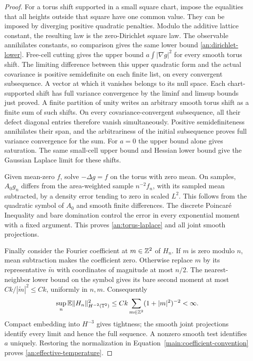 \begin{proof}
For a torus shift supported in a small square chart, impose
the equalities that all heights outside that square have one
common value.  They can be imposed by diverging positive
quadratic penalties.  Modulo the additive lattice constant,
the resulting law is the zero-Dirichlet square law.  The
observable annihilates constants, so comparison gives the
same lower bound \eqref{an:dirichlet-lower}.  Free-cell
cutting gives the upper bound $a\int|\nabla g|^2$ for every
smooth torus shift.  The limiting difference between this
upper quadratic form and the actual covariance is positive
semidefinite on each finite list, on every convergent
subsequence.  A vector at which it vanishes belongs to its
null space.  Each chart-supported shift has full variance convergence by the
liminf and limsup bounds just proved. A finite partition of unity writes
an arbitrary smooth torus shift as a finite sum of such shifts.
On every covariance-convergent subsequence, all their defect diagonal
entries therefore vanish simultaneously. Positive semidefiniteness
annihilates their span, and the arbitrariness of the initial subsequence
proves full variance convergence for the sum.
For $a=0$ the upper bound alone gives saturation.  The same
small-cell upper bound and Hessian lower bound give the
Gaussian Laplace limit for these shifts.

Given mean-zero $f$, solve $-\Delta g=f$ on the torus with
zero mean.  On samples, $A_0g_n$ differs from the
area-weighted sample $n^{-2}f_n$, with its sampled mean
subtracted, by a density error tending to zero in scaled
$L^2$.  This follows from the quadratic symbol of $A_0$ and
smooth finite differences.  The discrete Poincar\'e Inequality
and bare domination control the error in every exponential
moment with a fixed argument.  This proves
\eqref{an:torus-laplace} and all joint smooth projections.

Finally consider the Fourier coefficient at $m\in\mathbb Z^2$ of
$H_n$.  If $m$ is zero modulo $n$, mean subtraction makes
the coefficient zero.  Otherwise replace $m$ by its
representative $\tilde m$ with coordinates of magnitude at
most $n/2$.  The nearest-neighbor lower bound on the symbol
gives its bare second moment at most
$Ck/|\tilde m|^2\le Ck$, uniformly in $n,m$.
Consequently
\[
 \sup_n\mathbb E\|H_n\|_{H^{-2}(\mathbb T^2)}^2
       \le Ck\sum_{m\in\mathbb Z^2}(1+|m|^2)^{-2}<\infty.
\]
Compact embedding into $H^{-3}$ gives tightness; the smooth
joint projections identify every limit and hence the full
sequence.  A nonzero smooth test identifies $a$ uniquely.
Restoring the normalization in Equation~\eqref{main:coefficient-convention} proves
\eqref{an:effective-temperature}.
\end{proof}

